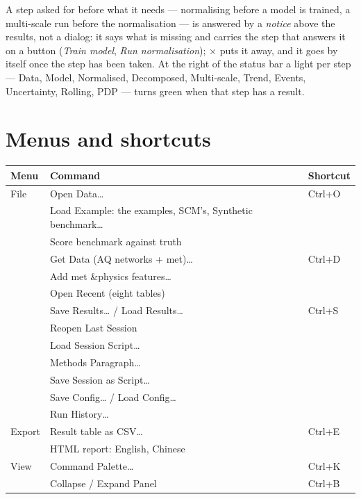 \documentclass[11pt]{report}
\begin{document}
A step asked for before what it needs --- normalising before a model is trained, a
multi-scale run before the normalisation --- is answered by a \emph{notice} above the results, not a
dialog: it says what is missing and carries the step that answers it on a button
(\emph{Train model}, \emph{Run normalisation}); \(\times\) puts it away, and it goes by itself
once the step has been taken. At the right of the status bar a light per step --- Data,
Model, Normalised, Decomposed, Multi-scale, Trend, Events, Uncertainty, Rolling, PDP ---
turns green when that step has a result.

\section{Menus and shortcuts}
\begin{center}\small
\begin{tabular}{@{}lll@{}}
\toprule
Menu & Command & Shortcut \\
\midrule
File     & Open Data\ldots                      & Ctrl+O \\
         & Load Example: the examples, SCM's, Synthetic benchmark\ldots & \\
         & Score benchmark against truth        & \\
         & Get Data (AQ networks + met)\ldots & Ctrl+D \\
         & Add met \&physics features\ldots      & \\
         & Open Recent (eight tables)           & \\
         & Save Results\ldots{} / Load Results\ldots & Ctrl+S \\
         & Reopen Last Session                  & \\
         & Load Session Script\ldots            & \\
         & Methods Paragraph\ldots              & \\
         & Save Session as Script\ldots         & \\
         & Save Config\ldots{} / Load Config\ldots & \\
         & Run History\ldots                    & \\
Export   & Result table as CSV\ldots            & Ctrl+E \\
         & HTML report: English, Chinese       & \\
View     & Command Palette\ldots                & Ctrl+K \\
         & Collapse / Expand Panel              & Ctrl+B \\

\end{tabular}
\end{center}
\end{document}
